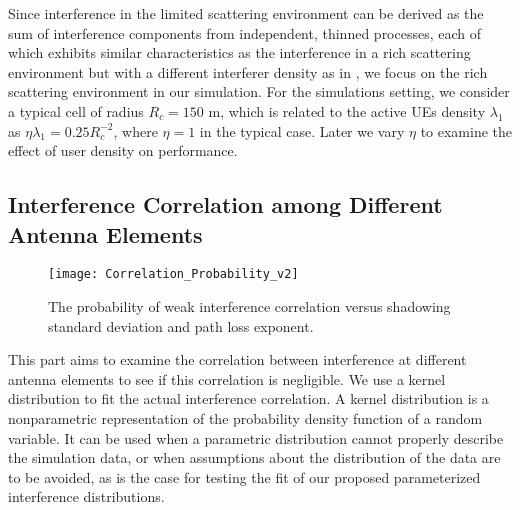 \documentclass[12pt, draftclsnofoot, onecolumn]{IEEEtran}
\theoremstyle{plain}
\begin{document}
{\color{black}Since interference in the limited scattering environment can be derived as the sum of interference components from independent, thinned processes, each of which exhibits similar characteristics as the interference in a rich scattering environment but with a different interferer density as in \cite{turgut2016coverage}, we focus on the rich scattering environment in our simulation.}
For the simulations setting, we consider a typical cell of radius $R_c = 150$ m, 
which is related to the active UEs density $\lambda_1$ as {$\eta \lambda_1 = 0.25 R_c^{-2}$}, where $\eta=1$ in the typical case. Later we vary $\eta$ to examine the effect of user density on performance.
%
%
%
\vspace{-.15in}
\subsection{Interference Correlation among Different Antenna Elements}\label{GeoModelCorCoef}%
\vspace{-0.1in}
%
%
%
\begin{figure}[t]%
        \centering
        \texttt{[image: Correlation\_Probability\_v2]}
        \vspace{-0.15in}
        \caption{{\small The probability of weak interference correlation versus shadowing standard deviation and path loss exponent.}}
        \label{corA2_b}
        \vspace{-0.48in}
    \vspace{-.15in}
\end{figure}%
This part aims to examine the correlation between interference at different antenna elements to see if this correlation is negligible. We use a kernel distribution to fit the actual interference correlation. A kernel distribution is a nonparametric representation of the probability density function of a random variable. It can be used when a parametric distribution cannot properly describe the simulation data, or when assumptions about the distribution of the data are to be avoided, as is the case for testing the fit of our proposed parameterized interference distributions. %
\end{document}
